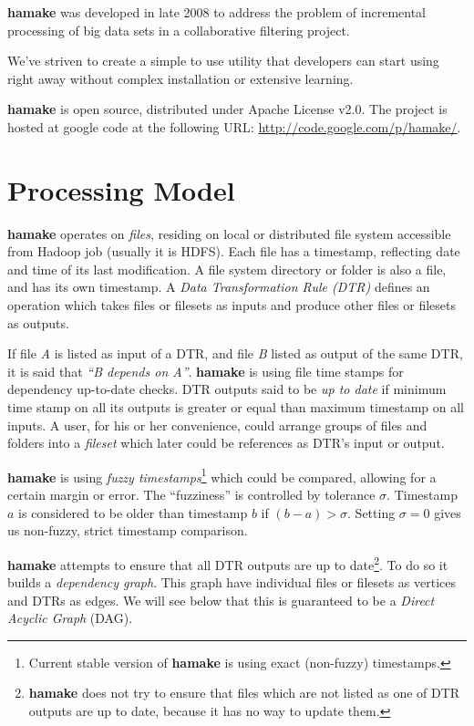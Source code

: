 \documentclass[10pt,conference,letterpaper]{IEEEtran}
\begin{document}
\textbf{hamake} was developed in late 2008 to address the problem of
incremental processing of big data sets in a collaborative filtering
project.

We've striven to create a simple to use utility that developers can
start using right away without complex installation or extensive
learning. 

\textbf{hamake} is open source, distributed under Apache
License v2.0. The project is hosted at google code at the following
URL: \url{http://code.google.com/p/hamake/}.

\section{Processing Model}

\textbf{hamake} operates on \textit{files}, residing on local or
distributed file system accessible from Hadoop job (usually it is
HDFS). Each file has a timestamp, reflecting date and time of its last
modification. A file system directory or folder is also a file, and
has its own timestamp. A \textit{Data Transformation Rule (DTR)}
defines an operation which takes files or filesets as inputs and
produce other files or filesets as outputs.

If file \textit{A} is listed as input of a DTR, and file \textit{B}
listed as output of the same DTR, it is said that \textit{``B depends
  on A''}. \textbf{hamake} is using file time stamps for dependency
up-to-date checks. DTR outputs said to be \textit{up to date} if
minimum time stamp on all its outputs is greater or equal than maximum
timestamp on all inputs. A user, for his or her convenience, could
arrange groups of files and folders into a \emph{fileset} which later
could be references as DTR's input or output.

\textbf{hamake} is using \textit{fuzzy timestamps}\footnote{Current stable
  version of \textbf{hamake} is using exact (non-fuzzy) timestamps.}
which could be compared, allowing for a certain margin or error. The
``fuzziness'' is controlled by tolerance $\sigma$. Timestamp $a$ is
considered to be older than timestamp $b$ if $(b-a)>\sigma$. Setting
$\sigma=0$ gives us non-fuzzy, strict timestamp comparison.

\textbf{hamake} attempts to ensure that all DTR outputs are up to
date\footnote{\textbf{hamake} does not try to ensure that files which are not
  listed as one of DTR outputs are up to date, because it has no way
  to update them.}.  To do so it builds a \textit{dependency
  graph}. This graph have individual files or filesets as vertices and
DTRs as edges. We will see below that this is guaranteed to be a
\textit{Direct Acyclic Graph} (DAG).
\end{document}
